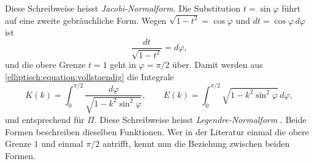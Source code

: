 Diese Schreibweise heisst \emph{Jacobi-Normalform}.
Die Substitution $t = \sin\varphi$ führt auf eine zweite
gebräuchliche Form.
Wegen $\sqrt{1-t^2} = \cos\varphi$ und $dt = \cos\varphi\,d\varphi$
ist
\begin{equation}
\frac{dt}{\sqrt{1-t^2}}
=
d\varphi,
\label{elliptisch:equation:legendresubst}
\end{equation}
und die obere Grenze $t = 1$ geht in $\varphi = \pi/2$ über.
Damit werden aus \eqref{elliptisch:equation:vollstaendig} die
Integrale
\begin{equation}
K(k)
=
\int_0^{\pi/2} \frac{d\varphi}{\sqrt{1-k^2\sin^2\varphi}},
\qquad
E(k)
=
\int_0^{\pi/2} \sqrt{1-k^2\sin^2\varphi}\,d\varphi,
\label{elliptisch:equation:legendreform}
\end{equation}
und entsprechend für $\Pi$.
Diese Schreibweise heisst \emph{Legendre-Normalform}
\cite[Abschnitt 11.1.2]{elliptisch:mueller-spezielle}.
%
%
Beide Formen beschreiben dieselben Funktionen.
Wer in der Literatur einmal die obere Grenze $1$ und einmal
$\pi/2$ antrifft, kennt nun die Beziehung zwischen beiden Formen.


